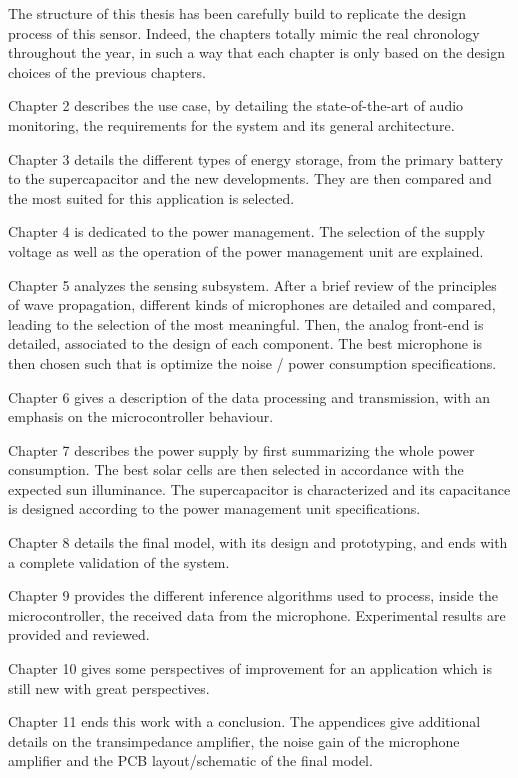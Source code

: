 \documentclass{EPL-master-thesis-covers-EN}
\begin{document}
The structure of this thesis has been carefully build to replicate the design process of this sensor. Indeed, the chapters totally mimic the real chronology throughout the year, in such a way that each chapter is only based on the design choices of the previous chapters. 

Chapter 2 describes the use case, by detailing the state-of-the-art of audio monitoring, the requirements for the system and its general architecture.

Chapter 3 details the different types of energy storage, from the primary battery to the supercapacitor and the new developments. They are then compared and the most suited for this application is selected.  

Chapter 4 is dedicated to the power management. The selection of the supply voltage as well as the operation of the power management unit are explained.

Chapter 5 analyzes the sensing subsystem. After a brief review of the principles of wave propagation, different kinds of microphones are detailed and compared, leading to the selection of the most meaningful. Then, the analog front-end is detailed, associated to the design of each component. The best microphone is then chosen such that is optimize the noise / power consumption specifications.

Chapter 6 gives a description of the data processing and transmission, with an emphasis on the microcontroller behaviour.

Chapter 7 describes the power supply by first summarizing the whole power consumption. The best solar cells are then selected in accordance with the expected sun illuminance. The supercapacitor is characterized and its capacitance is designed according to the power management unit specifications.

Chapter 8 details the final model, with its design and prototyping, and ends with a complete validation of the system.

Chapter 9 provides the different inference algorithms used to process, inside the microcontroller, the received data from the microphone. Experimental results are provided and reviewed.

Chapter 10 gives some perspectives of improvement for an application which is still new with great perspectives.

Chapter 11 ends this work with a conclusion. The appendices give additional details on the transimpedance amplifier, the noise gain of the microphone amplifier and the PCB layout/schematic of the final model.
\end{document}
